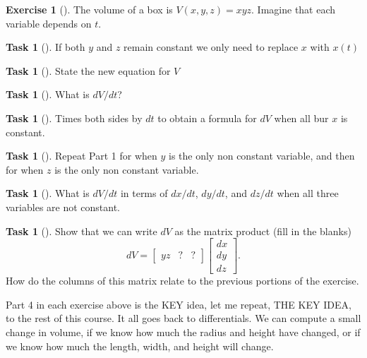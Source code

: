 \documentclass[10pt,]{book}
\theoremstyle{plain}
\theoremstyle{definition}
\theoremstyle{definition}
\theoremstyle{definition}
\theoremstyle{definition}
\newtheorem{exploration}[project]{Exercise}
\newtheorem{task}[project]{Task}
\theoremstyle{definition}
\numberwithin{equation}{section}
\newcommand{\amp}{&}
\begin{document}
\begin{exploration}[]\label{prob_volumebox}
The volume of a box is \(V(x,y,z)=xyz\). Imagine that each variable depends on \(t\).%
\begin{task}[]\label{task-272}
If both \(y\) and \(z\) remain constant we only need to replace \(x\) with \(x(t)\)%
\begin{task}[]\label{task-273}
State the new equation for \(V\)%
\end{task}
\begin{task}[]\label{task-274}
What is \(dV/dt\)?%
\end{task}
\begin{task}[]\label{task-275}
Times both sides by \(dt\) to obtain a formula for \(dV\) when all bur \(x\) is constant.%
\end{task}
\end{task}
\begin{task}[]\label{task-276}
Repeat Part 1 for when \(y\) is the only non constant variable, and then for when \(z\) is the only non constant variable.%
\end{task}
\begin{task}[]\label{task-277}
What is \(dV/dt\) in terms of \(dx/dt\), \(dy/dt\), and \(dz/dt\) when all three variables are not constant.%
\end{task}
\begin{task}[]\label{task-278}
Show that we can write \(dV\) as the matrix product (fill in the blanks)%
\begin{equation*}
dV = \begin{bmatrix}yz\amp  ?\amp ?
\end{bmatrix} \begin{bmatrix}dx\\dy\\dz
\end{bmatrix} .
\end{equation*}
How do the columns of this matrix relate to the previous portions of the exercise.%
\end{task}
\end{exploration}
Part 4 in each exercise above is the KEY idea, let me repeat, THE KEY IDEA, to the rest of this course. It all goes back to differentials. We can compute a small change in volume, if we know how much the radius and height have changed, or if we know how much the length, width, and height will change.%
\end{document}
